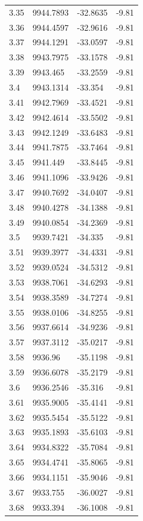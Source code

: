 \begin{table}[H]
\begin{tabular}{llll}
3.35 & 9944.7893 & -32.8635 & -9.81 \\
3.36 & 9944.4597 & -32.9616 & -9.81 \\
3.37 & 9944.1291 & -33.0597 & -9.81 \\
3.38 & 9943.7975 & -33.1578 & -9.81 \\
3.39 & 9943.465 & -33.2559 & -9.81 \\
3.4 & 9943.1314 & -33.354 & -9.81 \\
3.41 & 9942.7969 & -33.4521 & -9.81 \\
3.42 & 9942.4614 & -33.5502 & -9.81 \\
3.43 & 9942.1249 & -33.6483 & -9.81 \\
3.44 & 9941.7875 & -33.7464 & -9.81 \\
3.45 & 9941.449 & -33.8445 & -9.81 \\
3.46 & 9941.1096 & -33.9426 & -9.81 \\
3.47 & 9940.7692 & -34.0407 & -9.81 \\
3.48 & 9940.4278 & -34.1388 & -9.81 \\
3.49 & 9940.0854 & -34.2369 & -9.81 \\
3.5 & 9939.7421 & -34.335 & -9.81 \\
3.51 & 9939.3977 & -34.4331 & -9.81 \\
3.52 & 9939.0524 & -34.5312 & -9.81 \\
3.53 & 9938.7061 & -34.6293 & -9.81 \\
3.54 & 9938.3589 & -34.7274 & -9.81 \\
3.55 & 9938.0106 & -34.8255 & -9.81 \\
3.56 & 9937.6614 & -34.9236 & -9.81 \\
3.57 & 9937.3112 & -35.0217 & -9.81 \\
3.58 & 9936.96 & -35.1198 & -9.81 \\
3.59 & 9936.6078 & -35.2179 & -9.81 \\
3.6 & 9936.2546 & -35.316 & -9.81 \\
3.61 & 9935.9005 & -35.4141 & -9.81 \\
3.62 & 9935.5454 & -35.5122 & -9.81 \\
3.63 & 9935.1893 & -35.6103 & -9.81 \\
3.64 & 9934.8322 & -35.7084 & -9.81 \\
3.65 & 9934.4741 & -35.8065 & -9.81 \\
3.66 & 9934.1151 & -35.9046 & -9.81 \\
3.67 & 9933.755 & -36.0027 & -9.81 \\
3.68 & 9933.394 & -36.1008 & -9.81 \\

\end{tabular}
\end{table}
